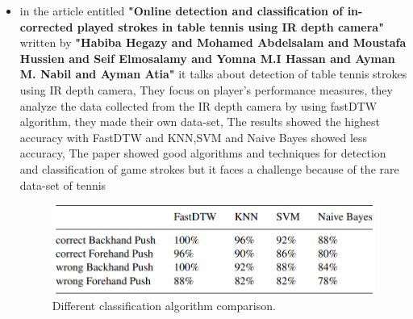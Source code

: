 \documentclass[12pt]{article}
\begin{document}
\begin{itemize}
        \item in the article entitled \textbf{"Online detection and classification of in-corrected played strokes in table tennis using IR depth camera"} written by \textbf{"Habiba Hegazy and Mohamed Abdelsalam and Moustafa Hussien and Seif Elmosalamy and Yomna M.I Hassan and Ayman M. Nabil and Ayman Atia"} it talks about detection of table tennis strokes using IR depth camera, They focus on player's performance measures, they analyze the data collected from the IR depth camera by using fastDTW algorithm, they made their own data-set, The results showed the highest accuracy with FastDTW and KNN,SVM and Naive Bayes showed less accuracy, The paper showed good algorithms and techniques for detection and classification of game strokes but it faces a challenge because of the rare data-set of tennis 
        
        \begin{figure}[H]
        \centering
        \includegraphics[width=0.75\linewidth]{figures/detres.PNG}
        \caption{Different classification algorithm comparison.}
        \label{fig Different classification algorithm comparison}
        \end{figure}


\end{itemize}
\end{document}
